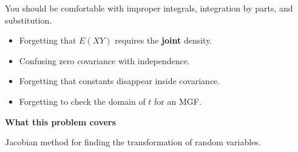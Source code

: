 \documentclass[11pt]{article}
\begin{document}
\begin{toolbox}

You should be comfortable with improper integrals, integration by parts, and substitution.
 
\end{toolbox}

\begin{warningbox}
\begin{itemize}[leftmargin=*]
    \item Forgetting that \(E(XY)\) requires the \textbf{joint} density.
    \item Confusing zero covariance with independence.
    \item Forgetting that constants disappear inside covariance.
    \item Forgetting to check the domain of \(t\) for an MGF.
\end{itemize}
\end{warningbox}


\newpage

\begin{topicbox}

\textbf{What this problem covers}


Jacobian method for finding the transformation of random variables.

\end{topicbox}
\end{document}
